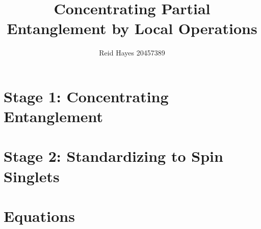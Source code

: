 \documentclass[12pt,letterpaper]{article}
\author{Reid Hayes 20457389}
\title{Concentrating Partial Entanglement by Local Operations}
\begin{document}
\maketitle
\section{Stage 1: Concentrating Entanglement}
\section{Stage 2: Standardizing to Spin Singlets}
\section{Equations}

\end{document}

